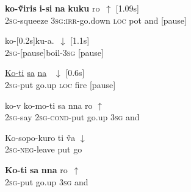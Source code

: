 \documentclass[output=paper]{LSP/langsci}
\begin{document}
  \begin{exe}
\ex \label{Guapp13}
\gll      \textbf{ko-\H{v}iris}          \textbf{i-si}                 \textbf{na}   \textbf{kuku} ro~$\uparrow$  [1.09s]\\     	       
   \textsc{2sg}-squeeze     \textsc{3sg:irr-}go.down   \textsc{loc}  pot  and [pause]\\
\glt {} 
\end{exe}


  \begin{exe}
\ex \label{Guapp14}
\gll  ko-[0.2s]ku-a.~$\downarrow$  [1.1s]  \\     	       
\textsc{2sg}-[pause]boil-\textsc{3sg} [pause] \\
\glt {} 
\end{exe}

  \begin{exe}
\ex \label{Guapp15}
\gll  \underline{Ko-ti}       \underline{sa}     \underline{na}  \underline{}~$\downarrow$  [0.6s]  \\     	       
\textsc{2sg}-put   go.up   \textsc{loc}  fire [pause] \\
\glt {} 
\end{exe}

  \begin{exe}
\ex \label{Guapp16}
\gll  ko-v      ko-mo-ti          sa      nna   ro $\uparrow$   \\     	       
\textsc{2sg}-say \textsc{2sg-cond}-put   go.up   \textsc{3sg}   and  \\
\glt {} 
\end{exe}

  \begin{exe}
\ex \label{Guapp17}
\gll  Ko-sopo-kuro    ti    \H{v}a $\downarrow$   \\     	       
\textsc{2sg-neg}-leave   put   go  \\
\glt {} 
\end{exe}


  \begin{exe}
\ex \label{Guapp18}
\gll  \textbf{Ko-ti}       \textbf{sa}     \textbf{nna}  ro~$\uparrow$  \\     	       
\textsc{2sg}-put   go.up    \textsc{3sg}   and  \\
\glt {} 
\end{exe}
\end{document}
